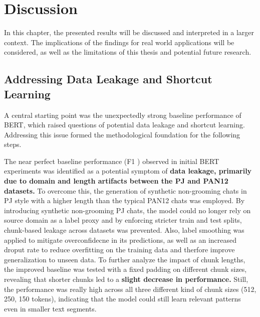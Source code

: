 \chapter{Discussion}
In this chapter, the presented results will be discussed and interpreted in a larger context. The implications of the findings for real world applications will be considered, as well as the limitations of this thesis and potential future research. 

\section{Addressing Data Leakage and Shortcut Learning}
A central starting point was the unexpectedly strong baseline performance of BERT, which raised questions of potential data leakage and shortcut learning. Addressing this issue formed the methodological foundation for the following steps.

The near perfect baseline performance (F1 ) observed in initial BERT experiments was identified as a potential symptom of \textbf{data leakage, primarily due to domain and length artifacts between the PJ and PAN12 datasets.} To overcome this, the generation of synthetic non-grooming chats in PJ style with a higher length than the typical PAN12 chats was employed. By introducing synthetic non-grooming PJ chats, the model could no longer rely on source domain as a label proxy and by enforcing stricter train and test splits, chunk-based leakage across datasets was prevented. Also, label smoothing was applied to mitigate overconfidecne in its predictions, as well as an increased droput rate to reduce overfitting on the training data and therfore improve generalization to unseen data. To further analyze the impact of chunk lengths, the improved baseline was tested with a fixed padding on different chunk sizes, revealing that shorter chunks led to a \textbf{slight decrease in performance.} Still, the performance was really high across all three different kind of chunk sizes (512, 250, 150 tokens), indicating that the model could still learn relevant patterns even in smaller text segments. 
